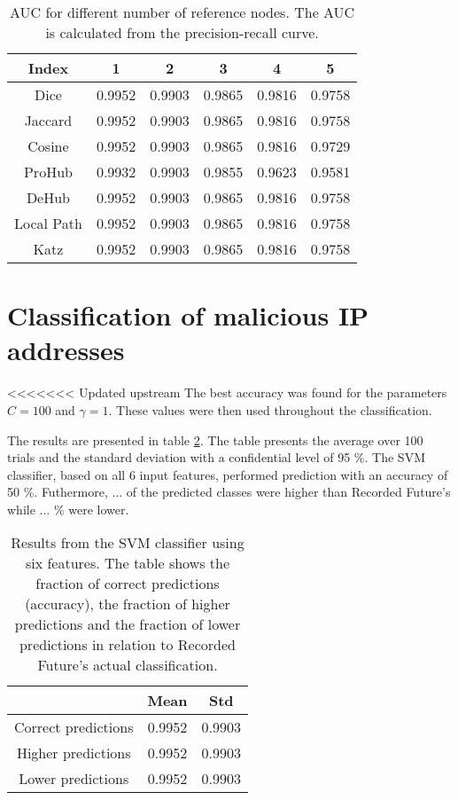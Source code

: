 \begin{table}[h!]
    \centering
    \caption{AUC for different number of reference nodes. The AUC is calculated from the precision-recall curve.}
    \begin{tabular}{|c|c|c|c|c|c|} %
    \hline
        Index   & 1 & 2 & 3 & 4 & 5 \\ \hline
        Dice    & 0.9952 &  0.9903  & 0.9865 & 0.9816 & 0.9758 \\
        Jaccard & 0.9952 &  0.9903  & 0.9865 & 0.9816 & 0.9758\\
        Cosine  & 0.9952 &  0.9903  & 0.9865 & 0.9816 & 0.9729 \\
        ProHub  & 0.9932 &  0.9903  & 0.9855 & 0.9623 & 0.9581 \\
        DeHub   & 0.9952 &  0.9903  & 0.9865 & 0.9816 & 0.9758 \\
        Local Path   & 0.9952 &  0.9903  & 0.9865 & 0.9816 & 0.9758 \\
        Katz   & 0.9952 &  0.9903  & 0.9865 & 0.9816 & 0.9758 \\ \hline
    \end{tabular}
    \label{aucIndex2}
\end{table}

\section{Classification of malicious IP addresses}

<<<<<<< Updated upstream
The best accuracy was found for the parameters $C=100$ and $\gamma=1$. These values were then used throughout the classification. 

The results are presented in table \ref{IpRes}. The table presents the average over 100 trials and the standard deviation with a confidential level of 95 \%. The SVM classifier, based on all 6 input features, performed prediction with an accuracy of 50 \%. Futhermore, ... of the predicted classes were higher than Recorded Future's while ... \% were lower. 

\begin{table}[h!]
    \centering
    \caption{Results from the SVM classifier using six features. The table shows the fraction of correct predictions (accuracy), the fraction of higher predictions and the fraction of lower predictions in relation to Recorded Future's actual classification.}
    \begin{tabular}{|c|c|c|}
    \hline
        ~   & Mean & Std  \\ \hline
        Correct predictions & 0.9952 &  0.9903 \\
        Higher predictions  & 0.9952 &  0.9903\\
        Lower predictions   & 0.9952 &  0.9903\\ \hline
    \end{tabular}
    \label{IpRes}
\end{table}

